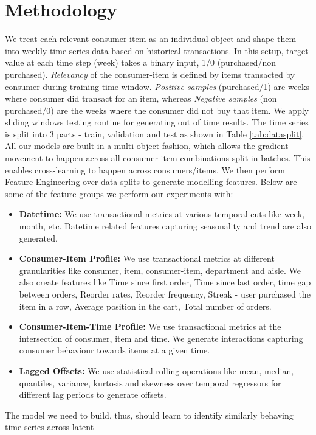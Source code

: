 \section{Methodology}
\label{sec:methodology}
We treat each relevant consumer-item as an individual object and shape them into weekly time series data
based on historical transactions. In this setup, target value at each time step (week) takes a binary input, 1/0 
(purchased/non purchased). \emph{Relevancy} of the consumer-item is defined by items transacted by consumer during training 
time window. \emph{Positive samples} (purchased/1) are weeks where consumer did transact for an item, whereas 
\emph{Negative samples} (non purchased/0) are the weeks where the consumer did not buy that item.
We apply sliding windows testing routine for generating
out of time results. The time series is split into 3 parts - train, validation and
test as shown in Table \ref{tab:datasplit}. All our models are built in a multi-object 
fashion, which allows the gradient movement to happen across all consumer-item combinations split in batches. This enables 
cross-learning to happen across consumers/items. We then perform Feature Engineering over data splits to generate
modelling features. Below are some of the feature groups we perform our experiments with:
\begin{itemize}
\item {\bf Datetime:} We use transactional metrics at various temporal cuts like week, month, etc.
Datetime related features capturing seasonality and trend are also generated.
\item {\bf Consumer-Item Profile:} We use transactional metrics at different granularities like consumer, item,
consumer-item, department and aisle. We also create features like Time since first order, 
Time since last order, time gap between orders, Reorder rates, Reorder frequency, 
Streak - user purchased the item in a row, Average position in the cart, Total number of orders.
\item {\bf Consumer-Item-Time Profile:} We use transactional metrics at the intersection of consumer, item and time.
We generate interactions capturing consumer behaviour towards items at a given time.
\item {\bf Lagged Offsets:} We use statistical rolling operations like mean, median, quantiles, variance, 
kurtosis and skewness over temporal regressors for different lag periods to generate offsets.
\end{itemize}
The model we need to build, thus, should learn to identify similarly behaving time series across latent
